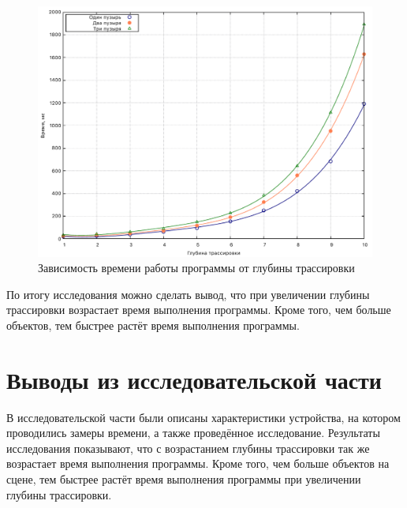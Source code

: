 \begin{figure}[h]
 \begin{center}
  \includegraphics[width=0.9\linewidth]{img/graph.pdf}
 \end{center}
 \captionsetup{justification=centering}
 \caption{Зависимость времени работы программы от глубины трассировки}
 \label{img:graph}
\end{figure}

По итогу исследования можно сделать вывод, что при увеличении глубины трассировки возрастает время выполнения программы. Кроме того, чем больше объектов, тем быстрее растёт время выполнения программы.

\section{Выводы из исследовательской части}

В исследовательской части были описаны характеристики устройства, на котором проводились замеры времени, а также проведённое исследование. Результаты исследования показывают, что с возрастанием глубины трассировки так же возрастает время выполнения программы. Кроме того, чем больше объектов на сцене, тем быстрее растёт время выполнения программы при увеличении глубины трассировки.